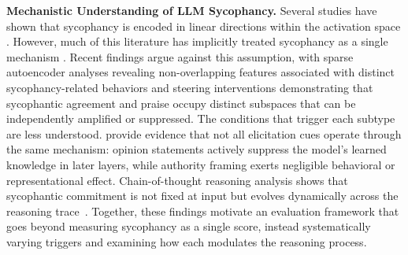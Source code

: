 \textbf{Mechanistic Understanding of LLM Sycophancy.}
Several studies have shown that sycophancy is encoded in linear directions within the activation space \cite{jain2025psychometrictraits, papadatos2024probepenalty, chen2025personavectors, rimsky2024steering, vennemeyer2025causalsycophancy, genadi2026linear}. 
However, much of this literature has implicitly treated sycophancy as a single mechanism \cite{rimsky2024steering, chen2025personavectors, papadatos2024probepenalty}. 
Recent findings argue against this assumption, with sparse autoencoder analyses \cite{templeton2024scaling} revealing non-overlapping features associated with distinct sycophancy-related behaviors and steering interventions \cite{vennemeyer2025causalsycophancy} demonstrating that sycophantic agreement and praise occupy distinct subspaces that can be independently amplified or suppressed.
The conditions that trigger each subtype are less understood. \cite{wang2025truthoverridden} provide evidence that not all elicitation cues operate through the same mechanism: opinion
statements actively suppress the model's learned knowledge in later layers, while authority framing exerts negligible behavioral or representational effect. 
Chain-of-thought reasoning analysis shows that sycophantic commitment is not fixed at input but evolves dynamically across the reasoning trace~\cite{feng2026good, mirtaheri2026catching, duszenko2026anchors, hu2026MONICA}. 
Together, these findings motivate an evaluation framework that goes beyond measuring sycophancy as a single score, instead systematically varying triggers and examining how each modulates the reasoning process.



